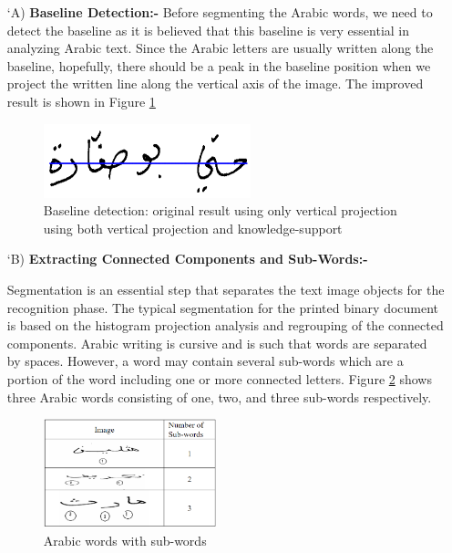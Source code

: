 \begin{itemize}[labelindent=1em,labelsep=0.25cm,leftmargin=*]
        \item[\char `A)] \textbf{Baseline Detection:-}
        Before  segmenting  the  Arabic  words,  we  need  to detect  the  baseline  as  it  is  believed  that  this  baseline  is  very  essential  in  analyzing  Arabic  text.  Since  the  Arabic  letters  are  usually written along the baseline, hopefully, there should be a peak in the baseline position when we project the written line along the vertical axis of the image.
        The  improved result is shown in Figure \ref{fig:basline}
 
         \begin{figure}[!htb]
            \centering
            \includegraphics[width=6cm]{images/basline.png}
            \caption{Baseline detection: original result using only vertical projection using both vertical projection and knowledge-support}
            \label{fig:basline}
        \end{figure}
        
        \item[\char `B)] \textbf{Extracting Connected Components and Sub-Words:-}
        
        Segmentation is an essential step that separates the text image objects for the recognition phase. The typical segmentation for the printed binary document is based on the histogram projection analysis and regrouping of the connected components. Arabic writing is cursive  and is such that words are separated by spaces. However,  a  word may contain several sub-words which are a portion  of  the  word including one or more connected letters.
Figure \ref{fig:subword} shows three Arabic words consisting of one, two, and three sub-words respectively. 

 \begin{figure}[!htb]
    \centering
    \includegraphics[width=5cm]{images/subword.png}
    \caption{Arabic words with sub-words}
    \label{fig:subword}
\end{figure}


\end{itemize}
